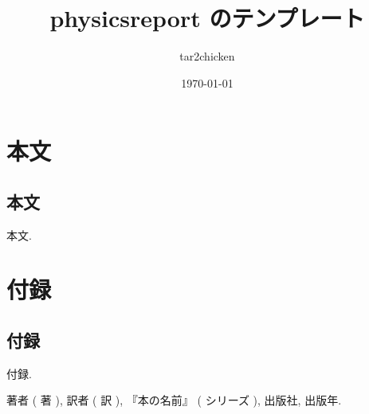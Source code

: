 \documentclass[dvipdfmx]{jsarticle}
\title{physicsreport のテンプレート}
\author{tar2chicken}
\date{\today}
\begin{document}
\maketitle
\tableofcontents
\section{本文}
	\subsection{本文}
		本文.


\section{付録}
	\subsection{付録}
		付録.
		\begin{thebibliography}{9}
			 著者 ( 著 ), 訳者 ( 訳 ), 『本の名前』 ( シリーズ ), 出版社, 出版年.
		\end{thebibliography}
\end{document}
